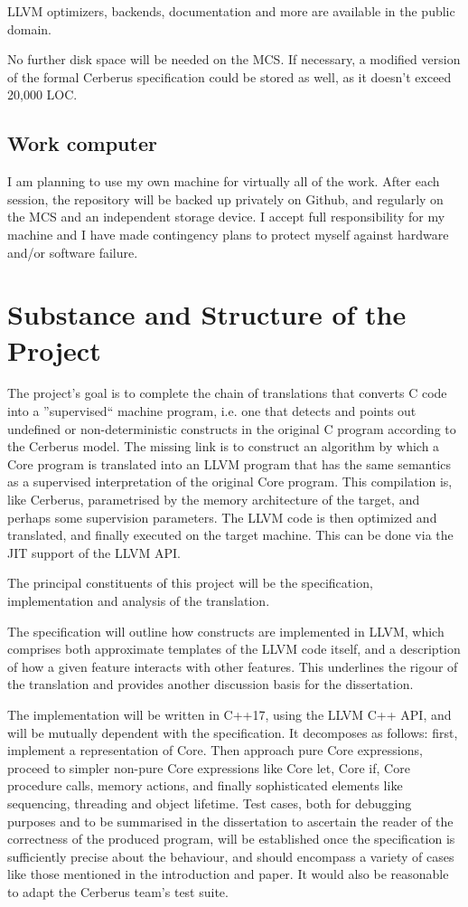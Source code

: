 \documentclass[12pt]{article}
\begin{document}
LLVM optimizers, backends, documentation and more are available in the public domain. 

No further disk space will be needed on the MCS. If necessary, a modified version of the formal Cerberus specification could be stored as well, as it doesn't exceed 20,000 LOC.

\subsection{Work computer}
I am planning to use my own machine for virtually all of the work. After each session, the repository will be backed up privately on Github, and regularly on the MCS and an independent storage device. I accept full responsibility for my machine and I have made contingency plans to protect myself against hardware and/or software failure.

\section{Substance and Structure of the Project}
The project's goal is to complete the chain of translations that converts C code into a ''supervised`` machine program, i.e. one that detects and points out undefined or non-deterministic constructs in the original C program according to the Cerberus model. The missing link is to construct an algorithm by which a Core program is translated into an LLVM program that has the same semantics as a supervised interpretation of the original Core program. This compilation is, like Cerberus, parametrised by the memory architecture of the target, and perhaps some supervision parameters. The LLVM code is then optimized and translated, and finally executed on the target machine. This can be done via the JIT support of the LLVM API.

The principal constituents of this project will be the specification, implementation and analysis of the translation. 

The specification will outline how constructs are implemented in LLVM, which comprises both approximate templates of the LLVM code itself, and a description of how a given feature interacts with other features. This underlines the rigour of the translation and provides another discussion basis for the dissertation.

The implementation will be written in C++17, using the LLVM C++ API\cite{LLVM}, and will be mutually dependent with the specification. It decomposes as follows: first, implement a representation of Core. Then approach pure Core expressions, proceed to simpler non-pure Core expressions like Core let, Core if, Core procedure calls, memory actions, and finally sophisticated elements like sequencing, threading and object lifetime. Test cases, both for debugging purposes and to be summarised in the dissertation to ascertain the reader of the correctness of the produced program, will be established once the specification is sufficiently precise about the behaviour, and should encompass a variety of cases like those mentioned in the introduction and paper. It would also be reasonable to adapt the Cerberus team's test suite. 
\end{document}
